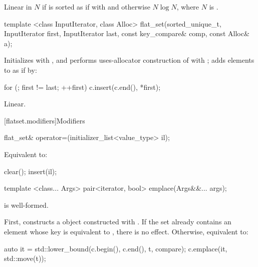 \begin{codeblock}
\begin{codeblock}
\begin{codeblock}
\begin{addedblock}
\begin{itemdescr}
\pnum
\complexity
Linear in $N$ if  is sorted as if with  and
otherwise $N \log N$, where $N$ is .
\end{itemdescr}

%
\begin{itemdecl}
template <class InputIterator, class Alloc>
  flat_set(sorted_unique_t, InputIterator first, InputIterator last,
           const key_compare& comp, const Alloc& a);
\end{itemdecl}

\begin{itemdescr}
\pnum
\effects Initializes  with , and performs
uses-allocator construction of 
with ; adds elements to  as if by:
\begin{codeblock}
for (; first != last; ++first) {
  c.insert(c.end(), *first);
}
\end{codeblock}

\pnum
\complexity
Linear.
\end{itemdescr}

[flatset.modifiers]{Modifiers}

%
\begin{itemdecl}
flat_set& operator=(initializer_list<value_type> il);
\end{itemdecl}

\begin{itemdescr}
\pnum
\effects Equivalent to:
\begin{codeblock}
clear();
insert(il);
\end{codeblock}
\end{itemdescr}

%
\begin{itemdecl}
template <class... Args> pair<iterator, bool> emplace(Args&&... args);
\end{itemdecl}

\begin{itemdescr}
\pnum \constraints {} is well-formed.

\pnum
\effects
First, constructs a  object  constructed
with .  If the set already contains an
element whose key is equivalent to , there is no effect.  Otherwise,
equivalent to:
\begin{codeblock}
auto it = std::lower_bound(c.begin(), c.end(), t, compare);
c.emplace(it, std::move(t));
\end{codeblock}


\end{itemdescr}
\end{addedblock}
\end{codeblock}
\end{codeblock}
\end{codeblock}
